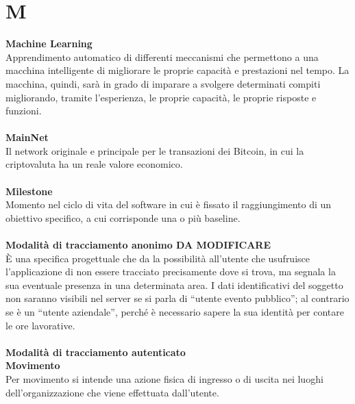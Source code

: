 \section{M}
\textbf{Machine Learning}\\
Apprendimento automatico di differenti meccanismi che permettono a una macchina intelligente di migliorare le proprie capacità e prestazioni nel tempo. La macchina, quindi, sarà in grado di imparare a svolgere determinati compiti migliorando, tramite l’esperienza, le proprie capacità, le proprie risposte e funzioni. \\ \\
\textbf{MainNet}\\
Il network originale e principale per le transazioni dei Bitcoin, in cui la criptovaluta ha un reale valore economico. \\ \\
\textbf{Milestone}\\
Momento nel ciclo di vita del software in cui è fissato il raggiungimento di un obiettivo specifico, a cui corrisponde una o più baseline.\\ \\
\textbf{Modalità di tracciamento anonimo DA MODIFICARE}\\
È una specifica progettuale che da la possibilità all’utente che usufruisce l’applicazione di non essere tracciato precisamente dove si trova, ma segnala la sua eventuale presenza in una determinata area. I dati identificativi del soggetto non saranno visibili nel server se si parla di “utente evento pubblico”; al contrario se è un “utente aziendale”, perché è necessario sapere la sua identità per contare le ore lavorative. \\ \\

\textbf{Modalità di tracciamento autenticato}\\

\textbf{Movimento}\\
Per movimento si intende una azione fisica di ingresso o di uscita nei luoghi dell'organizzazione che viene effettuata dall'utente. \\ \\
\clearpage